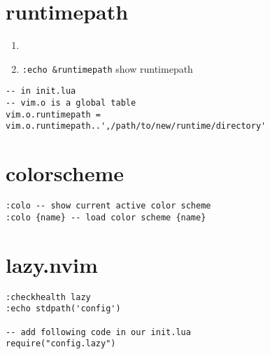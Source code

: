 \documentclass[12pt,a4paper]{article}
\begin{document}
\section{runtimepath}
\begin{enumerate}
	\item 
	\item \texttt{:echo \&runtimepath} show runtimepath
\end{enumerate}

\begin{footnotesize}
\begin{verbatim}
-- in init.lua
-- vim.o is a global table
vim.o.runtimepath = vim.o.runtimepath..',/path/to/new/runtime/directory'
\end{verbatim}
\end{footnotesize}


\section{colorscheme}
\begin{footnotesize}
\begin{verbatim}
:colo -- show current active color scheme
:colo {name} -- load color scheme {name}
\end{verbatim}
\end{footnotesize}

\section{lazy.nvim}
\begin{footnotesize}
\begin{verbatim}
:checkhealth lazy
:echo stdpath('config')

-- add following code in our init.lua
require("config.lazy")
\end{verbatim}
\end{footnotesize}
\end{document}
